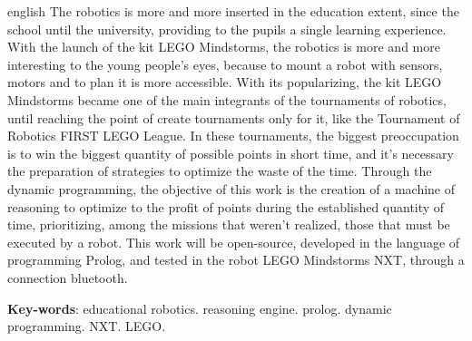 \begin{resumo}[Abstract]
 \begin{otherlanguage*}{english}
   The robotics is more and more inserted in the education extent, since the school until the university, providing to the pupils a single learning experience. With the launch of the kit LEGO Mindstorms, the robotics is more and more interesting to the young people's eyes, because to mount a robot with sensors, motors and to plan it is more accessible. With its popularizing, the kit LEGO Mindstorms became one of the main integrants of the tournaments of robotics, until reaching the point of create tournaments only for it, like the Tournament of Robotics FIRST LEGO League. In these tournaments, the biggest preoccupation is to win the biggest quantity of possible points in short time, and it's necessary the preparation of strategies to optimize the waste of the time. Through the dynamic programming, the objective of this work is the creation of a machine of reasoning to optimize to the profit of points during the established quantity of time, prioritizing, among the missions that weren't realized, those that must be executed by a robot. This work will be open-source, developed in the language of programming Prolog, and tested in the robot LEGO Mindstorms NXT, through a connection bluetooth.

   \vspace{\onelineskip}
 
   \noindent 
   \textbf{Key-words}: educational robotics. reasoning engine. prolog. dynamic programming. NXT. LEGO.
 \end{otherlanguage*}
\end{resumo}
